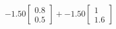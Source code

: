 \documentclass[preview]{standalone}
\begin{document}
\begin{align*}
-1.50 \begin{bmatrix} 0.8 \\ 0.5 \end{bmatrix} + -1.50 \begin{bmatrix} 1 \\ 1.6 \end{bmatrix}
\end{align*}
\end{document}

